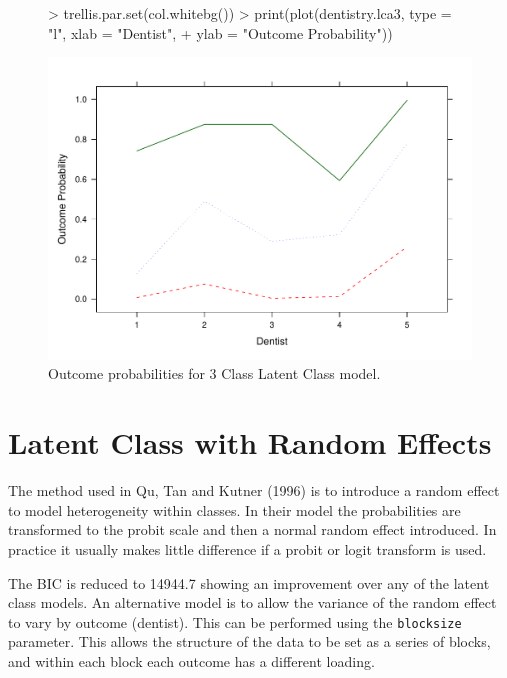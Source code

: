 \documentclass[a4paper]{article}
\begin{document}
\begin{figure}
  \centering
\begin{Schunk}
\begin{Sinput}
> trellis.par.set(col.whitebg())
> print(plot(dentistry.lca3, type = "l", xlab = "Dentist", 
+     ylab = "Outcome Probability"))
\end{Sinput}
\end{Schunk}
\includegraphics{randomLCA-example-input-005}
  \caption{Outcome probabilities for 3 Class Latent Class model.}
  \label{fig:outcome3}
\end{figure}

\section{Latent Class with Random Effects}

The method used in Qu, Tan and Kutner (1996) is to introduce a random effect to model heterogeneity within classes. In their model the probabilities are transformed to the probit scale and then a normal random effect introduced. In practice it usually makes little difference if a probit or logit transform is used.



\begin{Schunk}
\end{Schunk}

The BIC is reduced to 14944.7 showing an improvement over any of the latent class models. An alternative model is to allow the variance of the random effect to vary by outcome (dentist). This can be performed using the \texttt{blocksize} parameter. This allows the structure of the data to be set as a series of blocks, and within each block each outcome has a different loading.
\end{document}
